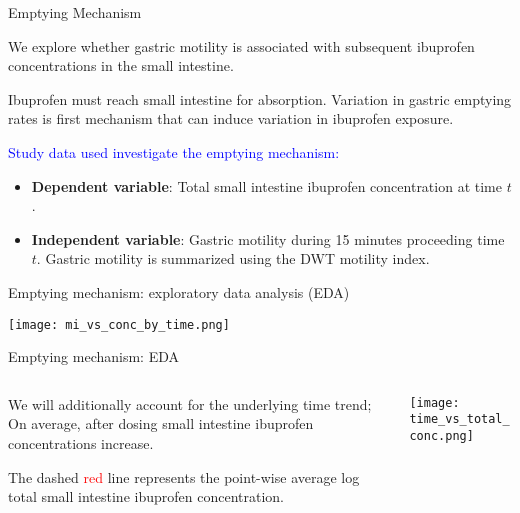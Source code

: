 \documentclass[]{beamer}
\begin{document}
\begin{frame}[c]{Emptying Mechanism}

We explore whether gastric motility is associated with subsequent ibuprofen concentrations in the small intestine.

\bigskip

Ibuprofen must reach small intestine for absorption. Variation in gastric emptying rates is first mechanism that can induce variation in ibuprofen exposure.

\bigskip

\textcolor{blue}{Study data used investigate the emptying mechanism:}
\begin{itemize}
	\item {\bf Dependent variable}: Total small intestine  ibuprofen concentration at time $t$.
	\item {\bf Independent variable}: Gastric motility during 15 minutes proceeding time $t$. Gastric motility is summarized using the DWT motility index.
\end{itemize}

\end{frame}

\begin{frame}[c]{Emptying mechanism: exploratory data analysis (EDA)}

\texttt{[image: mi\_vs\_conc\_by\_time.png]}

\end{frame}


\begin{frame}[c]{Emptying mechanism: EDA }
\begin{columns}
\begin{column}{.4\textwidth}

We will additionally account for the underlying time trend; On average, after dosing small intestine ibuprofen concentrations increase.

\bigskip

The dashed \textcolor{red}{red} line represents the point-wise average log total small intestine ibuprofen concentration.
\end{column}
\begin{column}{.6\textwidth}
\texttt{[image: time\_vs\_total\_conc.png]}
\end{column}
\end{columns}
\end{frame}
\end{document}
